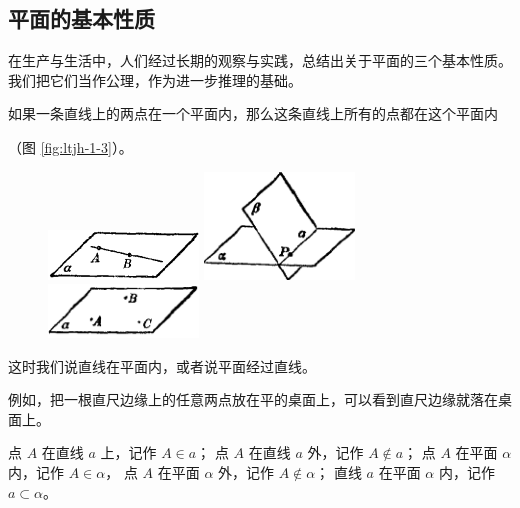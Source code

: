 \subsection{平面的基本性质}\label{subsec:1-2}

在生产与生活中，人们经过长期的观察与实践，总结出关于平面的三个基本性质。
我们把它们当作公理，作为进一步推理的基础。

\begin{gongli}[公理1][gl:pm-1]%
    如果一条直线上的两点在一个平面内，那么这条直线上所有的点都在这个平面内
\end{gongli}（图 \ref{fig:ltjh-1-3}）。

\begin{figure}[htbp]
    \centering
    \begin{minipage}[b]{4cm}
        \centering
        \includegraphics[width=4cm]{../pic/ltjh-ch1-03.png}
        \caption{}\label{fig:ltjh-1-3}
    \end{minipage}
    \qquad
    \begin{minipage}[b]{4cm}
        \centering
        \includegraphics[width=4cm]{../pic/ltjh-ch1-04.png}
        \caption{}\label{fig:ltjh-1-4}
    \end{minipage}
    \qquad
    \begin{minipage}[b]{4cm}
        \centering
        \includegraphics[width=4cm]{../pic/ltjh-ch1-05.png}
        \caption{}\label{fig:ltjh-1-5}
    \end{minipage}
\end{figure}


这时我们说直线在平面内，或者说平面经过直线。

例如，把一根直尺边缘上的任意两点放在平的桌面上，可以看到直尺边缘就落在桌面上。

点 $A$ 在直线 $a$ 上，记作 $A \in a$；
点 $A$ 在直线 $a$ 外，记作 $A \not \in a$；
点 $A$ 在平面 $\alpha$ 内，记作 $A \in \alpha$，
点 $A$ 在平面 $\alpha$ 外，记作 $A \not \in \alpha$；
直线 $a$ 在平面 $\alpha$ 内，记作 $a \subset\alpha$。

